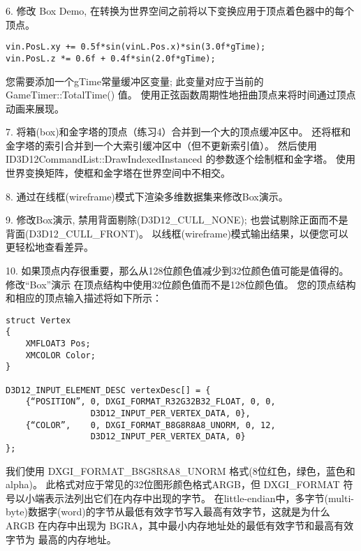 \begin{flushleft}
6. 修改 Box Demo, 在转换为世界空间之前将以下变换应用于顶点着色器中的每个顶点。
\end{flushleft}
\begin{lstlisting}
vin.PosL.xy += 0.5f*sin(vinL.Pos.x)*sin(3.0f*gTime);
vin.PosL.z *= 0.6f + 0.4f*sin(2.0f*gTime);
\end{lstlisting}
\begin{flushleft}
您需要添加一个gTime常量缓冲区变量; 此变量对应于当前的 GameTimer::TotalTime() 值。 使用正弦函数周期性地扭曲顶点来将时间通过顶点动画来展现。
\end{flushleft}

\begin{flushleft}
7. 将箱(box)和金字塔的顶点（练习4）合并到一个大的顶点缓冲区中。 还将框和金字塔的索引合并到一个大索引缓冲区中（但不更新索引值）。 然后使用 ID3D12CommandList::DrawIndexedInstanced 的参数逐个绘制框和金字塔。 使用世界变换矩阵，使框和金字塔在世界空间中不相交。
\end{flushleft}

\begin{flushleft}
8. 通过在线框(wireframe)模式下渲染多维数据集来修改Box演示。
\end{flushleft}

\begin{flushleft}
9. 修改Box演示, 禁用背面剔除(D3D12\_CULL\_NONE); 也尝试剔除正面而不是背面(D3D12\_CULL\_FRONT)。 以线框(wireframe)模式输出结果，以便您可以更轻松地查看差异。
\end{flushleft}

\begin{flushleft}
10. 如果顶点内存很重要，那么从128位颜色值减少到32位颜色值可能是值得的。修改“Box”演示 在顶点结构中使用32位颜色值而不是128位颜色值。 您的顶点结构和相应的顶点输入描述将如下所示：\\
\end{flushleft}
\begin{lstlisting}
struct Vertex
{
    XMFLOAT3 Pos;
    XMCOLOR Color;
}

D3D12_INPUT_ELEMENT_DESC vertexDesc[] = {
    {“POSITION”, 0, DXGI_FORMAT_R32G32B32_FLOAT, 0, 0, 
                 D3D12_INPUT_PER_VERTEX_DATA, 0},
    {“COLOR”,    0, DXGI_FORMAT_B8G8R8A8_UNORM, 0, 12,
                 D3D12_INPUT_PER_VERTEX_DATA, 0}
};
\end{lstlisting}
\begin{flushleft}
我们使用 DXGI\_FORMAT\_B8G8R8A8\_UNORM 格式(8位红色，绿色，蓝色和alpha)。 此格式对应于常见的32位图形颜色格式ARGB，但 DXGI\_FORMAT 符号以小端表示法列出它们在内存中出现的字节。 在little-endian中，多字节(multi-byte)数据字(word)的字节从最低有效字节写入最高有效字节，这就是为什么 ARGB 在内存中出现为 BGRA，其中最小内存地址处的最低有效字节和最高有效字节为 最高的内存地址。
\end{flushleft}

